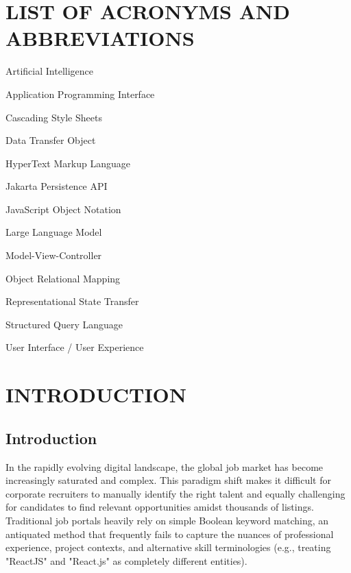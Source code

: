 \documentclass[12pt]{report}
\begin{document}
\chapter*{LIST OF ACRONYMS AND ABBREVIATIONS} 
\begin{abbrv} 
\item[\textbf{AI}] Artificial Intelligence
\item[\textbf{API}] Application Programming Interface
\item[\textbf{CSS}] Cascading Style Sheets
\item[\textbf{DTO}] Data Transfer Object
\item[\textbf{HTML}] HyperText Markup Language
\item[\textbf{JPA}] Jakarta Persistence API
\item[\textbf{JSON}] JavaScript Object Notation
\item[\textbf{LLM}] Large Language Model
\item[\textbf{MVC}] Model-View-Controller
\item[\textbf{ORM}] Object Relational Mapping 
\item[\textbf{REST}] Representational State Transfer
\item[\textbf{SQL}] Structured Query Language
\item[\textbf{UI/UX}] User Interface / User Experience
\end{abbrv} 

\newpage 
\renewcommand*\contentsname{TABLE OF CONTENTS}    
\tableofcontents 

\thispagestyle{empty} 
 
\chapter{INTRODUCTION} 
\linespread{1.5}\selectfont 

\section{Introduction}
In the rapidly evolving digital landscape, the global job market has become increasingly saturated and complex. This paradigm shift makes it difficult for corporate recruiters to manually identify the right talent and equally challenging for candidates to find relevant opportunities amidst thousands of listings. Traditional job portals heavily rely on simple Boolean keyword matching, an antiquated method that frequently fails to capture the nuances of professional experience, project contexts, and alternative skill terminologies (e.g., treating "ReactJS" and "React.js" as completely different entities). 
\end{document}
